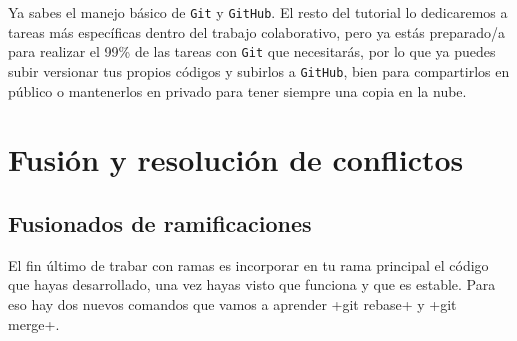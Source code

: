 \documentclass[a5paper,10pt]{article}
\begin{document}
    Ya sabes el manejo básico de \verb+Git+ y \verb+GitHub+. El resto del tutorial lo dedicaremos a tareas más específicas dentro del trabajo colaborativo, pero ya estás preparado/a para realizar el 99\% de las tareas con \verb+Git+ que necesitarás, por lo que ya puedes subir versionar tus propios códigos  y subirlos a \verb+GitHub+, bien para compartirlos en público o mantenerlos en privado para tener siempre una copia en la nube.

  \section{Fusión y resolución de conflictos}
  \subsection{Fusionados de ramificaciones}
    El fin último de trabar con ramas es incorporar en tu rama principal el código que hayas desarrollado, una vez hayas visto que funciona y que es estable. Para eso hay dos nuevos comandos que vamos a aprender \cverb+git rebase+ y \cverb+git merge+.
    
\end{document}
